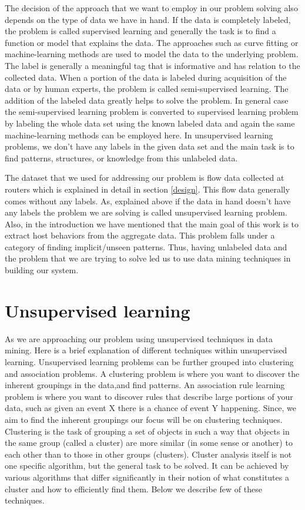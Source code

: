 The decision of the approach that we want to employ in our problem solving also depends on the type of data we have in hand. If the data is completely labeled, the problem is called supervised learning and generally the task is to find a function or model that explains the data. The approaches such as curve fitting or machine-learning methods are used to model the data to the underlying problem. The label is generally a meaningful tag that is informative and has relation to the collected data.  When a portion of the data is labeled during acquisition of the data or by human experts, the problem is called semi-supervised learning. The addition of the labeled data greatly helps to solve the problem. In general case the semi-supervised learning problem is converted to supervised learning problem by labeling the whole data set using the known labeled data and again the same machine-learning methods can be employed here. In unsupervised learning problems, we don't have any labels in the given data set and the main task is to find patterns, structures, or knowledge from this unlabeled data.   

The dataset that we used for addressing our problem is flow data collected at routers which is explained in detail in section \ref{design}. This flow data generally comes without any labels. As, explained above if the data in hand doesn't have any labels the problem we are solving is called unsupervised learning problem. Also, in the introduction we have mentioned that the main goal of this work is to extract host behaviors from the aggregate data. This problem falls under a category of finding implicit/unseen patterns. Thus, having unlabeled data and the problem that we are trying to solve led us to use data mining techniques in building our system.

\section{Unsupervised learning}  \label{unsupervised}
As we are approaching our problem using unsupervised techniques in data mining. Here is a brief explanation of different techniques within unsupervised learning.
Unsupervised learning problems can be further grouped into clustering and association problems. A clustering problem is where you want to discover the inherent groupings in the data,and find patterns. An association rule learning problem is where you want to discover rules that describe large portions of your data, such as given an event X there is a chance of event Y happening. Since, we aim to find the inherent groupings our focus will be on clustering techniques. Clustering is the task of grouping a set of objects in such a way that objects in the same group (called a cluster) are more similar (in some sense or another) to each other than to those in other groups (clusters). Cluster analysis itself is not one specific algorithm, but the general task to be solved. It can be achieved by various algorithms that differ significantly in their notion of what constitutes a cluster and how to efficiently find them. Below we describe few of these techniques.


